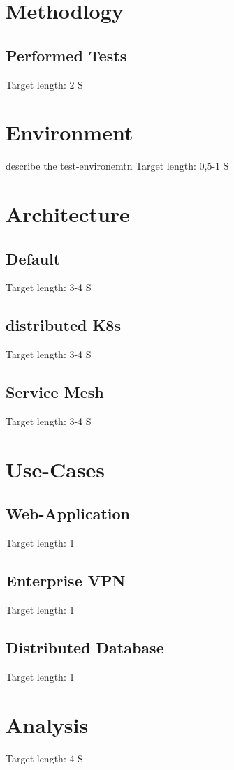 \documentclass[MSC,Master,english]{twbook}%
\begin{document}
\section{Methodlogy}
\label{sec:dsrmethode}
\subsection{Performed Tests}
Target length: 2 S

\section{Environment}
\label{sec:env}
describe the test-environemtn
Target length: 0,5-1 S

\section{Architecture}
\label{sec:dsrarchitecture}
\subsection{Default}
Target length: 3-4 S
\subsection{distributed K8s}
Target length: 3-4 S
\subsection{Service Mesh}
Target length: 3-4 S

\section{Use-Cases}
\subsection{Web-Application}
Target length: 1
\subsection{Enterprise VPN}
Target length: 1
\subsection{Distributed Database}
Target length: 1

\section{Analysis}
Target length: 4 S
\end{document}
